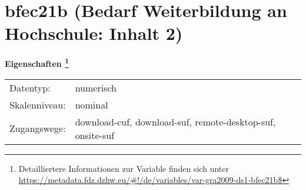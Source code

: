 
    \setcounter{footnote}{0}

    \vspace*{-1.8cm}
	\section{bfec21b (Bedarf Weiterbildung an Hochschule: Inhalt 2)}
	\label{section:bfec21b}



    \vspace*{0.5cm}
    \noindent\textbf{Eigenschaften
	\footnote{Detailliertere Informationen zur Variable finden sich unter
		\url{https://metadata.fdz.dzhw.eu/\#!/de/variables/var-gra2009-ds1-bfec21b$}}}\\
	\begin{tabularx}{\hsize}{@{}lX}
	Datentyp: & numerisch \\
	Skalenniveau: & nominal \\
	Zugangswege: &
	  download-cuf, 
	  download-suf, 
	  remote-desktop-suf, 
	  onsite-suf
 \\
    \end{tabularx}



